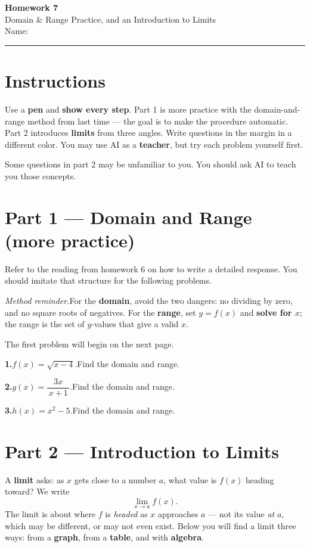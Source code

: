 \documentclass[12pt]{article}
\begin{document}
\pagestyle{fancy}
\begin{center}
  {\Large\bfseries Homework 7}\\[4pt]
  Domain \& Range Practice, and an Introduction to Limits\\[6pt]
  Name:\;\underline{\hspace{6.5cm}}\quad
\end{center}
\hrule\bigskip

\section*{Instructions}
Use a \textbf{pen} and \textbf{show every step}. Part 1 is more practice with the domain-and-range method from last
time --- the goal is to make the procedure automatic. Part 2 introduces \textbf{limits} from three angles. Write
questions in the margin in a different color. You may use AI as a \textbf{teacher}, but try each problem yourself first. 

Some questions in part 2 may be unfamiliar to you. You should ask AI to teach you those concepts.

\section*{Part 1 --- Domain and Range (more practice)}
Refer to the reading from homework 6 on how to write a detailed response. You should imitate that structure for the following problems.

\textit{Method reminder.}\quad For the \textbf{domain}, avoid the two dangers: no dividing by zero, and no square
roots of negatives. For the \textbf{range}, set $y = f(x)$ and \textbf{solve for $x$}; the range is the set of
$y$-values that give a valid $x$. 

The first problem will begin on the next page.

\newpage
\textbf{1.}\quad $f(x) = \sqrt{x - 4}$.\quad Find the domain and range.

\newpage

\bigskip
\textbf{2.}\quad $g(x) = \dfrac{3x}{\,x + 1\,}$.\quad Find the domain and range.

\newpage
\textbf{3.}\quad $h(x) = x^2 - 5$.\quad Find the domain and range.


\newpage
\section*{Part 2 --- Introduction to Limits}
A \textbf{limit} asks: as $x$ gets close to a number $a$, what value is $f(x)$ heading toward? We write
\[
  \lim_{x \to a} f(x).
\]
The limit is about where $f$ is \emph{headed} as $x$ approaches $a$ --- not its value \emph{at} $a$, which may be
different, or may not even exist. Below you will find a limit three ways: from a \textbf{graph}, from a
\textbf{table}, and with \textbf{algebra}.
\end{document}

